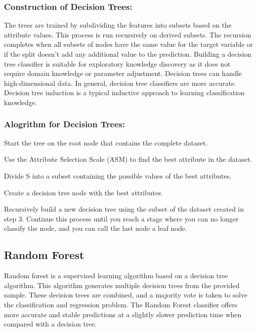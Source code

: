 \subsubsection{Construction of Decision Trees:}
\vspace{-0.5em}
The trees are trained by subdividing the features into subsets based on the attribute values. This process is run recursively on derived subsets. The recursion completes when all subsets of nodes have the same value for the target variable or if the split doesn't add any additional value to the prediction. Building a decision tree classifier is suitable for exploratory knowledge discovery as it does not require domain knowledge or parameter adjustment. Decision trees can handle high-dimensional data. In general, decision tree classifiers are more accurate. Decision tree induction is a typical inductive approach to learning classification knowledge.

\subsubsection{Alogrithm for Decision Trees:}
\begin{steps}
  \vspace{-0.5em}
  \setlength{\itemsep}{-0.2em}
  \item Start the tree on the root node that contains the complete dataset.
  \item Use the Attribute Selection Scale (ASM) to find the best attribute in the dataset.
  \item Divide S into a subset containing the possible values of the best attributes.
  \item Create a decision tree node with the best attributes.
  \item Recursively build a new decision tree using the subset of the dataset created in step 3. Continue this process until you reach a stage where you can no longer classify the node,   and you can call the last node a leaf node.
  \vspace{-1em}
\end{steps}

\subsection{Random Forest} \label{subsec:random_forest}
Random forest is a supervised learning algorithm based on a decision tree algorithm. This algorithm generates multiple decision trees from the provided sample. These decision trees are combined, and a majority vote is taken to solve the classification and regression problem. The Random Forest classifier offers more accurate and stable predictions at a slightly slower prediction time when compared with a decision tree.

